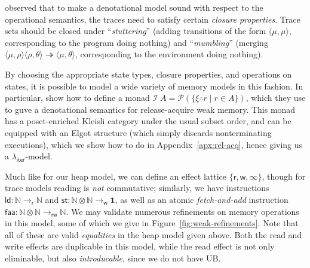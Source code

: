 \documentclass[acmsmall,screen,review]{acmart}
\newcommand{\mc}[1]{\ensuremath{\mathcal{#1}}}
\newcommand{\mb}[1]{\ensuremath{\mathbf{#1}}}
\newcommand{\ms}[1]{\ensuremath{\mathsf{#1}}}
\newcommand{\nats}{\mathbb{N}}
\newcommand{\tref}{\twoheadrightarrow}
\newcommand{\subiterexp}{\texorpdfstring{\(\lambda_{\ms{iter}}\)}{lambda-iter}}
\newcommand{\tret}[2]{#1 \therefore #2}
\begin{document}
\citet{brookes-full-abstraction-96} observed that to make a denotational model sound with respect to
the operational semantics, the traces need to satisfy certain \emph{closure properties}. Trace sets
should be closed under ``\emph{stuttering}'' (adding transitions of the form $\langle \mu, \mu
\rangle$, corresponding to the program doing nothing) and ``\emph{mumbling}'' (merging $\langle \mu,
\rho \rangle\langle \rho, \theta \rangle \tref \langle \mu, \theta \rangle$, corresponding to the
environment doing nothing).

By choosing the appropriate state types, closure properties, and operations on states, it is
possible to model a wide variety of memory models in this fashion. In particular,
\citet{release-acquire} show how to define a monad $\mc{I}\;A = \mc{P}(\{\tret{\xi}{r} \mid r \in
A\})$, which they use to guve a denotational semantics for release-acquire weak memory. This monad
has a poset-enriched Kleisli category under the usual subset order, and can be equipped with an
Elgot structure (which simply discards nonterminating executions), which we show how to do in
Appendix~\ref{apx:rel-acq}, hence giving us a \subiterexp{}-model.

Much like for our heap model, we can define an effect lattice $\{\ms{r}, \ms{w}, \infty\}$, though
for trace models reading is \emph{not} commutative; similarly, we have instructions $\ms{ld}: \nats
\to_{\ms{r}} \nats$ and $\ms{st}: \nats \otimes \nats \to_{\ms{w}} \mb{1}$, as well as an atomic
\emph{fetch-and-add} instruction $\ms{faa}: \nats \otimes \nats \to_{\ms{rw}} \nats$. We may
validate numerous refinements on memory operations in this model, some of which we give in
Figure~\ref{fig:weak-refinements}. Note that all of these are valid \emph{equalities} in the heap
model given above. Both the read and write effects are duplicable in this model, while the read
effect is not only eliminable, but also \emph{introducable}, since we do not have UB.
\end{document}
